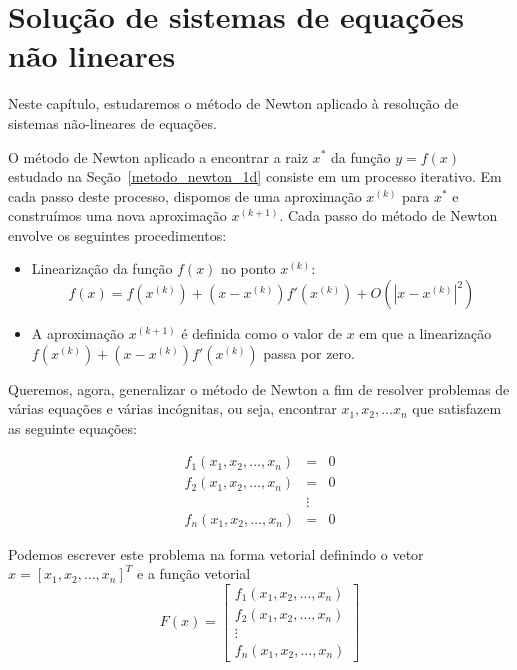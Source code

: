 
%

\chapter{Solução de sistemas de equações não lineares}
Neste capítulo, estudaremos o método de Newton aplicado à resolução de sistemas não-lineares de equações.

O método de Newton aplicado a encontrar a raiz $x^*$ da função $y=f(x)$ estudado na Seção~\ref{metodo_newton_1d} consiste em um processo iterativo. Em cada passo deste processo, dispomos de uma aproximação $x^{(k)}$ para $x^*$ e construímos uma nova aproximação $x^{(k+1)}$.  Cada passo do método de Newton envolve os seguintes procedimentos:
\begin{itemize}
\item Linearização da função $f(x)$ no ponto $x^{(k)}$: 
  \begin{equation*}
    f(x)= f(x^{(k)})+ (x-x^{(k)}) f'(x^{(k)}) + O\left(|x-x^{(k)}|^2\right)    
  \end{equation*}
\item A aproximação $x^{(k+1)}$ é definida como o valor de $x$ em que a linearização $f(x^{(k)})+ (x-x^{(k)}) f'(x^{(k)})$ passa por zero.
\end{itemize}


Queremos, agora, generalizar o método de Newton a fim de resolver problemas de várias equações e várias incógnitas, ou seja, encontrar $x_1,x_2,\ldots x_n$ que satisfazem as seguinte equações:

\begin{eqnarray*}
f_1(x_1,x_2,\ldots,x_n)&=&0\\
f_2(x_1,x_2,\ldots,x_n)&=&0\\
&\vdots&\\
f_n(x_1,x_2,\ldots,x_n)&=&0
\end{eqnarray*}

Podemos escrever este problema na forma vetorial definindo o vetor $x=[x_1,x_2,\ldots,x_n]^T$ e a função vetorial
$$F(x)=\left[
\begin{array}{c}
f_1(x_1,x_2,\ldots,x_n)\\
f_2(x_1,x_2,\ldots,x_n)\\
\vdots\\
f_n(x_1,x_2,\ldots,x_n)
\end{array}
\right]$$


